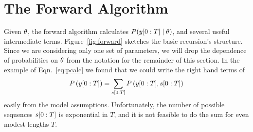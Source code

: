 \section{The Forward Algorithm}
\label{sec:forward}

Given $\theta$, the forward algorithm calculates
$P(y[0:T]\mid \theta)$, and several useful intermediate terms.
Figure~\ref{fig:forward} sketches the basic recursion's structure.
Since we are considering only one set of parameters, we will drop the
dependence of probabilities on $\theta$ from the notation for the
remainder of this section.  In the example of Eqn.~\eqref{eq:pcalc} we
found that we could write the right hand terms of
\begin{equation*}
   P\left( y[0:T] \right) = \sum_{s[0:T]}
   P\left( y[0:T],s[0:T] \right)
\end{equation*}
easily from the model assumptions.  Unfortunately, the number of
possible sequences $s[0:T]$ is exponential in $T$, and it is
not feasible to do the sum for even modest lengths $T$.


